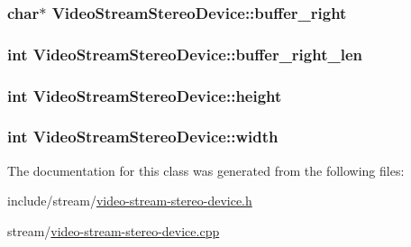 \subsubsection[{\texorpdfstring{buffer\+\_\+right}{buffer_right}}]{\setlength{\rightskip}{0pt plus 5cm}char$\ast$ Video\+Stream\+Stereo\+Device\+::buffer\+\_\+right\hspace{0.3cm}{\ttfamily [protected]}}\hypertarget{classVideoStreamStereoDevice_a1d854ebc4900384b76163e1cd738cd98}{}\label{classVideoStreamStereoDevice_a1d854ebc4900384b76163e1cd738cd98}
\subsubsection[{\texorpdfstring{buffer\+\_\+right\+\_\+len}{buffer_right_len}}]{\setlength{\rightskip}{0pt plus 5cm}int Video\+Stream\+Stereo\+Device\+::buffer\+\_\+right\+\_\+len\hspace{0.3cm}{\ttfamily [protected]}}\hypertarget{classVideoStreamStereoDevice_a7b8a59b76b5763b67cb357171c9396d7}{}\label{classVideoStreamStereoDevice_a7b8a59b76b5763b67cb357171c9396d7}
\subsubsection[{\texorpdfstring{height}{height}}]{\setlength{\rightskip}{0pt plus 5cm}int Video\+Stream\+Stereo\+Device\+::height\hspace{0.3cm}{\ttfamily [protected]}}\hypertarget{classVideoStreamStereoDevice_a97af0c098374ce089e71d9020b792f1f}{}\label{classVideoStreamStereoDevice_a97af0c098374ce089e71d9020b792f1f}
\subsubsection[{\texorpdfstring{width}{width}}]{\setlength{\rightskip}{0pt plus 5cm}int Video\+Stream\+Stereo\+Device\+::width\hspace{0.3cm}{\ttfamily [protected]}}\hypertarget{classVideoStreamStereoDevice_a87596748c13021a3623bb55de4c9be14}{}\label{classVideoStreamStereoDevice_a87596748c13021a3623bb55de4c9be14}


The documentation for this class was generated from the following files\+:\begin{DoxyCompactItemize}
\item 
include/stream/\hyperlink{video-stream-stereo-device_8h}{video-\/stream-\/stereo-\/device.\+h}\item 
stream/\hyperlink{video-stream-stereo-device_8cpp}{video-\/stream-\/stereo-\/device.\+cpp}\end{DoxyCompactItemize}

